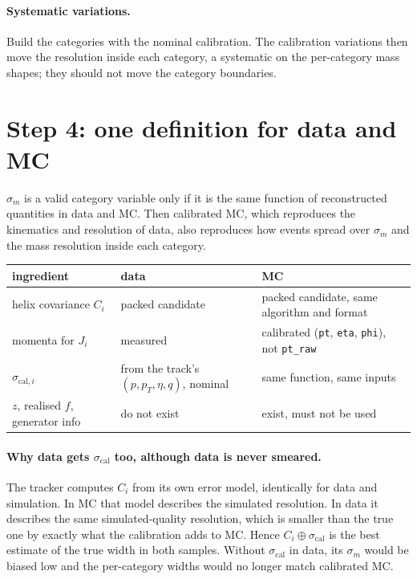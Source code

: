 \documentclass[11pt,a4paper]{article}
\newcommand{\br}[1]{\texttt{#1}}
\newcommand{\scal}{\sigma_{\mathrm{cal}}}
\begin{document}
\paragraph{Systematic variations.} Build the categories with the nominal calibration. The calibration
variations then move the resolution inside each category, a systematic on the per-category mass shapes; they
should not move the category boundaries.

\section{Step 4: one definition for data and MC}

$\sigma_m$ is a valid category variable only if it is the same function of reconstructed quantities in data
and MC. Then calibrated MC, which reproduces the kinematics and resolution of data, also reproduces how events
spread over $\sigma_m$ and the mass resolution inside each category.

\begin{center}
\begin{tabular}{>{\raggedright\arraybackslash}p{}>{\raggedright\arraybackslash}p{}>{\raggedright\arraybackslash}p{}}
\toprule
ingredient & data & MC \\
\midrule
helix covariance $C_i$ & packed candidate & packed candidate, same algorithm and format \\
momenta for $J_i$ & measured & calibrated (\br{pt}, \br{eta}, \br{phi}), not \br{pt\_raw} \\
$\sigma_{\mathrm{cal},i}$ & from the track's $(p,p_T,\eta,q)$, nominal & same function, same inputs \\
$z$, realised $f$, generator info & do not exist & exist, must not be used \\
\bottomrule
\end{tabular}
\end{center}

\paragraph{Why data gets $\scal$ too, although data is never smeared.} The tracker computes $C_i$ from its own
error model, identically for data and simulation. In MC that model describes the simulated resolution. In data
it describes the same simulated-quality resolution, which is smaller than the true one by exactly what the
calibration adds to MC. Hence $C_i\oplus\scal$ is the best estimate of the true width in both samples. Without
$\scal$ in data, its $\sigma_m$ would be biased low and the per-category widths would no longer match
calibrated MC.
\end{document}
